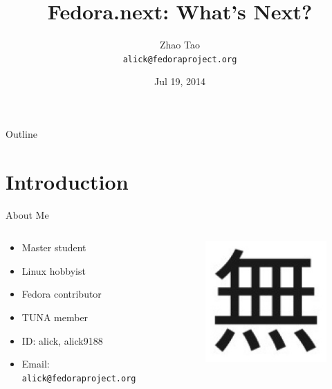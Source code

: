 \documentclass{beamer}
\title{Fedora.next: What's Next?}
\author[alick] %
{Zhao Tao\\ \texttt{alick@fedoraproject.org}}
\date[COSCUP 2014] %
{Jul 19, 2014}
\begin{document}
\begin{frame}
  \titlepage
\end{frame}

\begin{frame}{Outline}
  \tableofcontents
\end{frame}




\section{Introduction}

\begin{frame}{About Me}
  \begin{columns}
    \begin{column}{.75\textwidth}
  \begin{itemize}
    \item Master student
    \item Linux hobbyist
    \item Fedora contributor
    \item TUNA member
    \item ID: alick, alick9188
    \item Email: \texttt{alick@fedoraproject.org}
  \end{itemize}
    \end{column}
    \begin{column}{.25\textwidth}
      \begin{figure}[htbp]
        \centering
        \includegraphics[width=.6\textwidth]{wu.jpg}
      \end{figure}
    \end{column}
  \end{columns}
\end{frame}
\end{document}
